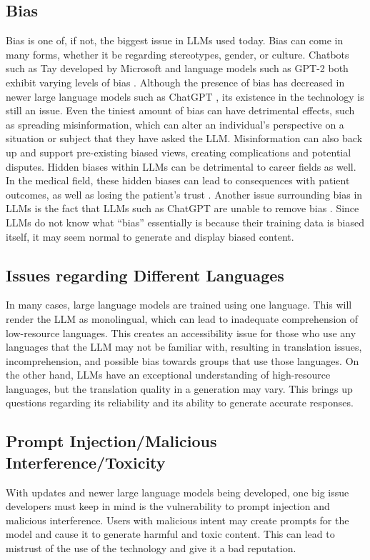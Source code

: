 \documentclass[12pt]{extarticle}
\begin{document}
\subsection{Bias}
Bias is one of, if not, the biggest issue in LLMs used today. Bias can come in many forms, whether it be regarding stereotypes, gender, or culture. Chatbots such as Tay developed by Microsoft and language models such as GPT-2 both exhibit varying levels of bias \cite{riseofchatgpt}. Although the presence of bias has decreased in newer large language models such as ChatGPT \cite{redteamingchatgpt}, its existence in the technology is still an issue. Even the tiniest amount of bias can have detrimental effects, such as spreading misinformation, which can alter an individual's perspective on a situation or subject that they have asked the LLM. Misinformation can also back up and support pre-existing biased views, creating complications and potential disputes. Hidden biases within LLMs can be detrimental to career fields as well. In the medical field, these hidden biases can lead to consequences with patient outcomes, as well as losing the patient's trust \cite{ethicsofllms}. Another issue surrounding bias in LLMs is the fact that LLMs such as ChatGPT are unable to remove bias \cite{redteamingchatgpt}. Since LLMs do not know what ``bias'' essentially is because their training data is biased itself, it may seem normal to generate and display biased content.

\subsection{Issues regarding Different Languages}
In many cases, large language models are trained using one language. This will render the LLM as monolingual, which can lead to inadequate comprehension of low-resource languages. This creates an accessibility issue for those who use any languages that the LLM may not be familiar with, resulting in translation issues, incomprehension, and possible bias towards groups that use those languages. On the other hand, LLMs have an exceptional understanding of high-resource languages, but the translation quality in a generation may vary. This brings up questions regarding its reliability and its ability to generate accurate responses.

\subsection{Prompt Injection/Malicious Interference/Toxicity}
With updates and newer large language models being developed, one big issue developers must keep in mind is the vulnerability to prompt injection and malicious interference. Users with malicious intent may create prompts for the model and cause it to generate harmful and toxic content. This can lead to mistrust of the use of the technology and give it a bad reputation.
\end{document}
